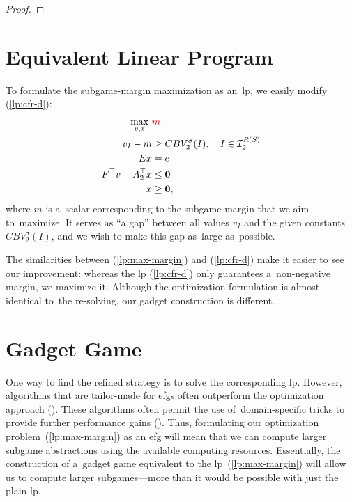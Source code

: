 \begin{proof}
  \todo
\end{proof}

\section{Equivalent Linear Program}
To formulate the subgame-margin maximization as an~\acrshort{lp}, we easily modify (\ref{lp:cfr-d}):
\begin{equation}
  \label{lp:max-margin}
  \begin{split}
    \max_{v, x}\ &\textcolor{red}{m} \\
    v_I - m &\ge CBV_2^\sigma(I), \quad I \in \mathcal{I}_2^{R(S)}\\ 
    Ex &= e \\
    F^\top v - A_2^\top x &\le \boldsymbol{0} \\
    x &\ge \boldsymbol{0},
  \end{split}
\end{equation}
where $m$ is a~scalar corresponding to the subgame margin that we aim to~maximize.
It serves as ``a gap'' between all values $v_I$ and the given constants $CBV_2^\sigma(I)$, and we wish to make this gap as~large as~possible.

The similarities between (\ref{lp:max-margin}) and (\ref{lp:cfr-d}) make it easier to see our improvement:
whereas the \acrshort{lp} (\ref{lp:cfr-d}) only guarantees a~non-negative margin, we maximize it.
Although the optimization formulation is almost identical to~the re-solving, our gadget construction is different.

\section{Gadget Game}
One way to find the refined strategy is to solve the corresponding \acrfull{lp}.
However, algorithms that are tailor-made for \acrshort{efg}s often outperform the optimization approach (\cite{Bosansky2013solving}).
These algorithms often permit the use of~domain-specific tricks to provide further performance gains (\cite{Johanson2012efficient}).
Thus, formulating our optimization problem~(\ref{lp:max-margin}) as an \acrshort{efg} will mean that we can compute larger subgame abstractions using the available computing resources.
Essentially, the construction of a~gadget game equivalent to the \acrshort{lp}~(\ref{lp:max-margin}) will allow us to compute larger subgames---more than it would be possible with just the plain \acrshort{lp}.

